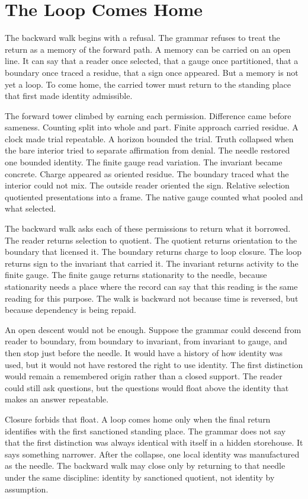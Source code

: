 \section{The Loop Comes Home}

The backward walk begins with a refusal. The grammar refuses to treat the
return as a memory of the forward path. A memory can be carried on an open
line. It can say that a reader once selected, that a gauge once partitioned,
that a boundary once traced a residue, that a sign once appeared. But a
memory is not yet a loop. To come home, the carried tower must return to the
standing place that first made identity admissible.

The forward tower climbed by earning each permission. Difference came before
sameness. Counting split into whole and part. Finite approach carried
residue. A clock made trial repeatable. A horizon bounded the trial. Truth
collapsed when the bare interior tried to separate affirmation from denial.
The needle restored one bounded identity. The finite gauge read variation.
The invariant became concrete. Charge appeared as oriented residue. The
boundary traced what the interior could not mix. The outside reader oriented
the sign. Relative selection quotiented presentations into a frame. The
native gauge counted what pooled and what selected.

The backward walk asks each of these permissions to return what it borrowed.
The reader returns selection to quotient. The quotient returns orientation to
the boundary that licensed it. The boundary returns charge to loop closure.
The loop returns sign to the invariant that carried it. The invariant returns
activity to the finite gauge. The finite gauge returns stationarity to the
needle, because stationarity needs a place where the record can say that this
reading is the same reading for this purpose. The walk is backward not
because time is reversed, but because dependency is being repaid.

An open descent would not be enough. Suppose the grammar could descend from
reader to boundary, from boundary to invariant, from invariant to gauge, and
then stop just before the needle. It would have a history of how identity
was used, but it would not have restored the right to use identity. The first
distinction would remain a remembered origin rather than a closed support.
The reader could still ask questions, but the questions would float above
the identity that makes an answer repeatable.

Closure forbids that float. A loop comes home only when the final return
identifies with the first sanctioned standing place. The grammar does not
say that the first distinction was always identical with itself in a hidden
storehouse. It says something narrower. After the collapse, one local
identity was manufactured as the needle. The backward walk may close only by
returning to that needle under the same discipline: identity by sanctioned
quotient, not identity by assumption.

